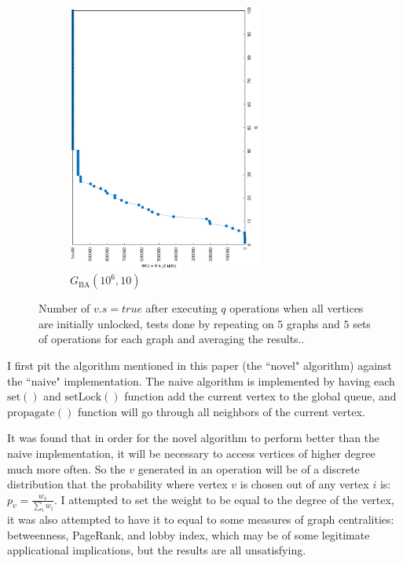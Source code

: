 \documentclass[12pt]{report}
\begin{document}
\begin{figure}
\begin{subfigure}{0.45\textwidth}
	\includegraphics[width=0.7\textwidth,angle=-90]{graph/ba_coverage_1000000_10_0.eps}
	\caption{$ G_\mathrm{BA}(10^6, 10) $}
\end{subfigure}
\caption{Number of $ v.s = \mathit{true} $ after executing $ q $ operations when all vertices are initially unlocked,
	     tests done by repeating on $ 5 $ graphs and $ 5 $ sets of operations for each graph and averaging the results..}
\end{figure}

I first pit the algorithm mentioned in this paper (the ``novel" algorithm) against the ``naive" implementation.
The naive algorithm is implemented by having each $ \mathrm{set}() $ and $ \mathrm{setLock}() $ function add the current vertex to the global queue,
and $ \mathrm{propagate}() $ function will go through all neighbors of the current vertex.

It was found that in order for the novel algorithm to perform better than the naive implementation,
it will be necessary to access vertices of higher degree much more often.
So the $ v $ generated in an operation will be of a discrete distribution
that the probability where vertex $ v $ is chosen out of any vertex $ i $ is: $ p_v = \frac{w_v}{\sum_i w_i} $.
I attempted to set the weight to be equal to the degree of the vertex,
it was also attempted to have it to equal to some measures of graph centralities: betweenness, PageRank, and lobby index,
which may be of some legitimate applicational implications,
but the results are all unsatisfying.\cite{freeman77}\cite{bp98}\cite{kst09}
\end{document}
